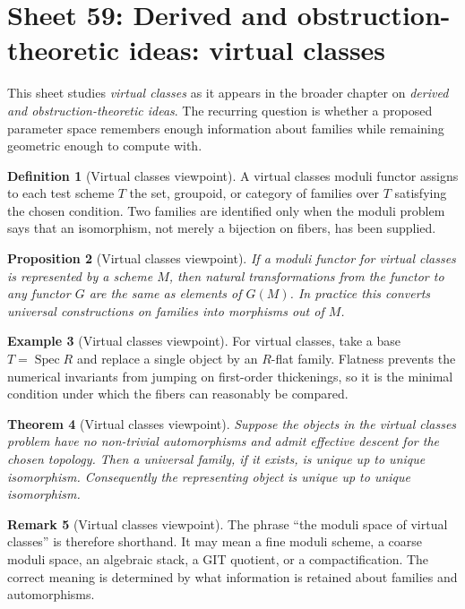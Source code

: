 \documentclass[11pt]{amsart}
\newtheorem{theorem}{Theorem}[section]
\newtheorem{proposition}[theorem]{Proposition}
\theoremstyle{definition}
\newtheorem{definition}[theorem]{Definition}
\newtheorem{example}[theorem]{Example}
\newtheorem{remark}[theorem]{Remark}
\newcommand{\Spec}{\operatorname{Spec}}
\begin{document}
\section{Sheet 59: Derived and obstruction-theoretic ideas: virtual classes}
This sheet studies \emph{virtual classes} as it appears in the broader chapter on \emph{derived and obstruction-theoretic ideas}.  The recurring question is whether a proposed parameter space remembers enough information about families while remaining geometric enough to compute with.
\begin{definition}[Virtual classes viewpoint]
A virtual classes moduli functor assigns to each test scheme $T$ the set, groupoid, or category of families over $T$ satisfying the chosen condition.  Two families are identified only when the moduli problem says that an isomorphism, not merely a bijection on fibers, has been supplied.
\end{definition}
\begin{proposition}[Virtual classes viewpoint]
If a moduli functor for virtual classes is represented by a scheme $M$, then natural transformations from the functor to any functor $G$ are the same as elements of $G(M)$.  In practice this converts universal constructions on families into morphisms out of $M$.
\end{proposition}
\begin{example}[Virtual classes viewpoint]
For virtual classes, take a base $T=\Spec R$ and replace a single object by an $R$-flat family.  Flatness prevents the numerical invariants from jumping on first-order thickenings, so it is the minimal condition under which the fibers can reasonably be compared.
\end{example}
\begin{theorem}[Virtual classes viewpoint]
Suppose the objects in the virtual classes problem have no non-trivial automorphisms and admit effective descent for the chosen topology.  Then a universal family, if it exists, is unique up to unique isomorphism.  Consequently the representing object is unique up to unique isomorphism.
\end{theorem}
\begin{remark}[Virtual classes viewpoint]
The phrase ``the moduli space of virtual classes'' is therefore shorthand.  It may mean a fine moduli scheme, a coarse moduli space, an algebraic stack, a GIT quotient, or a compactification.  The correct meaning is determined by what information is retained about families and automorphisms.
\end{remark}
\end{document}
